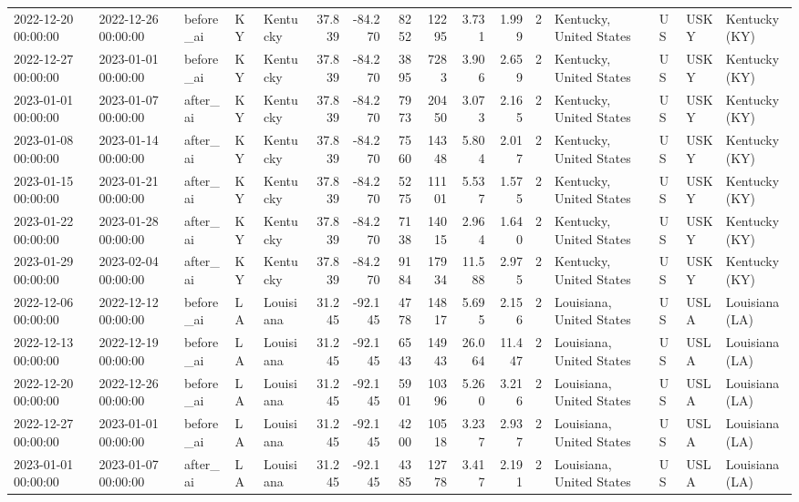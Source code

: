 \begin{tabular}{lllllrrrrrrlllll}
2022-12-20 00:00:00 & 2022-12-26 00:00:00 & before\_ai & KY & Kentucky & 37.839 & -84.270 & 8252 & 12295 & 3.731 & 1.999 & 2 & Kentucky, United States & US & USKY & Kentucky (KY) \\
2022-12-27 00:00:00 & 2023-01-01 00:00:00 & before\_ai & KY & Kentucky & 37.839 & -84.270 & 3895 & 7283 & 3.906 & 2.659 & 2 & Kentucky, United States & US & USKY & Kentucky (KY) \\
2023-01-01 00:00:00 & 2023-01-07 00:00:00 & after\_ai & KY & Kentucky & 37.839 & -84.270 & 7973 & 20450 & 3.073 & 2.165 & 2 & Kentucky, United States & US & USKY & Kentucky (KY) \\
2023-01-08 00:00:00 & 2023-01-14 00:00:00 & after\_ai & KY & Kentucky & 37.839 & -84.270 & 7560 & 14348 & 5.804 & 2.017 & 2 & Kentucky, United States & US & USKY & Kentucky (KY) \\
2023-01-15 00:00:00 & 2023-01-21 00:00:00 & after\_ai & KY & Kentucky & 37.839 & -84.270 & 5275 & 11101 & 5.537 & 1.575 & 2 & Kentucky, United States & US & USKY & Kentucky (KY) \\
2023-01-22 00:00:00 & 2023-01-28 00:00:00 & after\_ai & KY & Kentucky & 37.839 & -84.270 & 7138 & 14015 & 2.964 & 1.640 & 2 & Kentucky, United States & US & USKY & Kentucky (KY) \\
2023-01-29 00:00:00 & 2023-02-04 00:00:00 & after\_ai & KY & Kentucky & 37.839 & -84.270 & 9184 & 17934 & 11.588 & 2.975 & 2 & Kentucky, United States & US & USKY & Kentucky (KY) \\
2022-12-06 00:00:00 & 2022-12-12 00:00:00 & before\_ai & LA & Louisiana & 31.245 & -92.145 & 4778 & 14817 & 5.695 & 2.156 & 2 & Louisiana, United States & US & USLA & Louisiana (LA) \\
2022-12-13 00:00:00 & 2022-12-19 00:00:00 & before\_ai & LA & Louisiana & 31.245 & -92.145 & 6543 & 14943 & 26.064 & 11.447 & 2 & Louisiana, United States & US & USLA & Louisiana (LA) \\
2022-12-20 00:00:00 & 2022-12-26 00:00:00 & before\_ai & LA & Louisiana & 31.245 & -92.145 & 5901 & 10396 & 5.260 & 3.216 & 2 & Louisiana, United States & US & USLA & Louisiana (LA) \\
2022-12-27 00:00:00 & 2023-01-01 00:00:00 & before\_ai & LA & Louisiana & 31.245 & -92.145 & 4200 & 10518 & 3.237 & 2.937 & 2 & Louisiana, United States & US & USLA & Louisiana (LA) \\
2023-01-01 00:00:00 & 2023-01-07 00:00:00 & after\_ai & LA & Louisiana & 31.245 & -92.145 & 4385 & 12778 & 3.417 & 2.191 & 2 & Louisiana, United States & US & USLA & Louisiana (LA) \\

\end{tabular}
